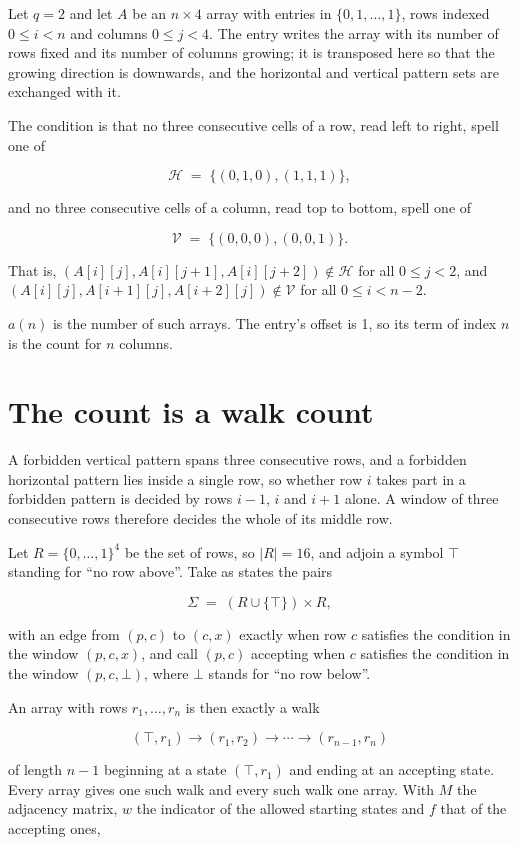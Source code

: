 \documentclass[11pt]{article}
\theoremstyle{definition}
\begin{document}
Let $q = 2$ and let $A$ be an $n \times 4$ array with entries in $\{0,1,\dots,1\}$, rows indexed $0 \le i < n$ and columns $0 \le j < 4$. The entry writes the array with its number of rows fixed and its number of columns growing; it is transposed here so that the growing direction is downwards, and the horizontal and vertical pattern sets are exchanged with it.

The condition is that no three consecutive cells of a row, read left to right, spell one of

\[\mathcal{H} \;=\; \{(0,1,0), (1,1,1)\},\]

and no three consecutive cells of a column, read top to bottom, spell one of

\[\mathcal{V} \;=\; \{(0,0,0), (0,0,1)\}.\]

That is, $(A[i][j],A[i][j{+}1],A[i][j{+}2]) \notin \mathcal{H}$ for all $0 \le j < 2$, and $(A[i][j],A[i{+}1][j],A[i{+}2][j]) \notin \mathcal{V}$ for all $0 \le i < n-2$.

$a(n)$ is the number of such arrays. The entry's offset is 1, so its term of index $n$ is the count for $n$ columns.

\section{The count is a walk count}

A forbidden vertical pattern spans three consecutive rows, and a forbidden horizontal pattern lies inside a single row, so whether row $i$ takes part in a forbidden pattern is decided by rows $i-1$, $i$ and $i+1$ alone. A window of three consecutive rows therefore decides the whole of its middle row.

Let $R = \{0,\dots,1\}^{4}$ be the set of rows, so $|R| = 16$, and adjoin a symbol $\top$ standing for ``no row above''. Take as states the pairs

\[\Sigma \;=\; (R \cup \{\top\}) \times R,\]

with an edge from $(p,c)$ to $(c,x)$ exactly when row $c$ satisfies the condition in the window $(p,c,x)$, and call $(p,c)$ accepting when $c$ satisfies the condition in the window $(p,c,\bot)$, where $\bot$ stands for ``no row below''.

An array with rows $r_1,\dots,r_n$ is then exactly a walk

\[(\top,r_1) \to (r_1,r_2) \to \cdots \to (r_{n-1},r_n)\]

of length $n-1$ beginning at a state $(\top,r_1)$ and ending at an accepting state. Every array gives one such walk and every such walk one array. With $M$ the adjacency matrix, $w$ the indicator of the allowed starting states and $f$ that of the accepting ones,
\end{document}
